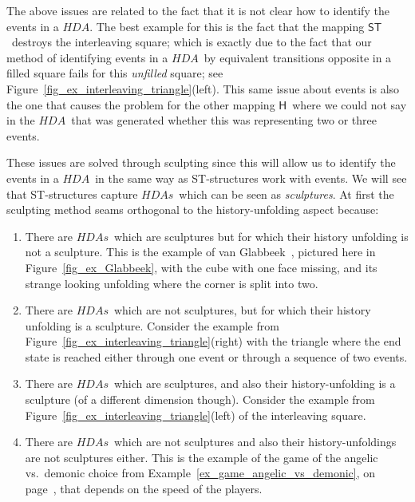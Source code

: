 \documentclass[submission,copyright,creativecommons]{eptcs}
\newcommand\HDA{\ensuremath{\mathit{HDA}}}
\newcommand\HDAs{\ensuremath{\mathit{HDAs}}}
\newcommand\stintoh{\ensuremath{\mathsf{H}}}
\newcommand\hintost{\ensuremath{\mathsf{ST}}}
\begin{document}
The above issues are related to the fact that it is not clear how to identify the events in a \HDA. The best example for this is the fact that the mapping \hintost\ destroys the interleaving square; which is exactly due to the fact that our method of identifying events in a \HDA\ by equivalent transitions opposite in a filled square fails for this \textit{unfilled} square; see Figure~\ref{fig_ex_interleaving_triangle}(left). This same issue about events is also the one that causes the problem for the other mapping \stintoh\ where we could not say in the \HDA\ that was generated whether this was representing two or three events.



These issues are solved through sculpting since this will allow us to identify the events in a \HDA\ in the same way as ST-structures work with events. We will see that ST-structures capture \HDAs\ which can be seen as \textit{sculptures}. At first the sculpting method seams orthogonal to the history-unfolding aspect because:

\begin{enumerate}
\item There are \HDAs\ which are sculptures but for which their history unfolding is not a sculpture. This is the example of van Glabbeek~\cite[Fig.11]{Glabbeek06HDA}, pictured here in Figure~\ref{fig_ex_Glabbeek}, with the cube with one face missing, and its strange looking unfolding where the corner is split into two.

\item There are \HDAs\ which are not sculptures, but for which their history unfolding is a sculpture. 
Consider the example from Figure~\ref{fig_ex_interleaving_triangle}(right) with the triangle where the end state is reached either through one event or through a sequence of two events.

\item There are \HDAs\ which are sculptures, and also their history-unfolding is a sculpture (of a different dimension though). 
Consider the example from Figure~\ref{fig_ex_interleaving_triangle}(left) of the interleaving square.

\item There are \HDAs\ which are not sculptures and also their history-unfoldings are not sculptures either. This is the example of the game of the angelic vs.\ demonic choice from Example~\ref{ex_game_angelic_vs_demonic}, on page~\pageref{ex_game_angelic_vs_demonic}, that depends on the speed of the players.
\end{enumerate}
\end{document}
